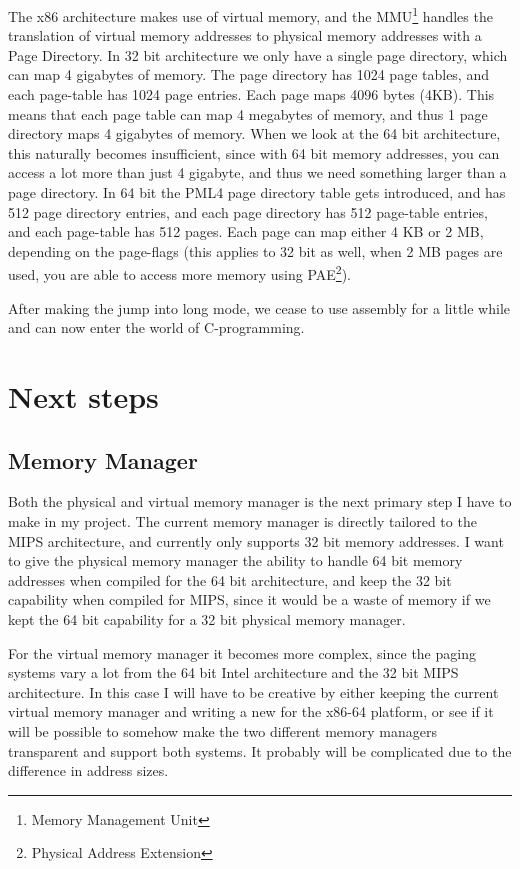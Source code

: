 The x86 architecture makes use of virtual memory, and the MMU\footnote{Memory Management Unit} handles the translation of virtual memory addresses to physical memory addresses with a Page Directory. In 32 bit architecture we only have a single page directory, which can map 4 gigabytes of memory. The page directory has 1024 page tables, and each page-table has 1024 page entries. Each page maps 4096 bytes (4KB). This means that each page table can map 4 megabytes of memory, and thus 1 page directory maps 4 gigabytes of memory. When we look at the 64 bit architecture, this naturally becomes insufficient, since with 64 bit memory addresses, you can access a lot more than just 4 gigabyte, and thus we need something larger than a page directory. In 64 bit the PML4 page directory table gets introduced, and has 512 page directory entries, and each page directory has 512 page-table entries, and each page-table has 512 pages. Each page can map either 4 KB or 2 MB, depending on the page-flags (this applies to 32 bit as well, when 2 MB pages are used, you are able to access more memory using PAE\footnote{Physical Address Extension}).

After making the jump into long mode, we cease to use assembly for a little while and can now enter the world of C-programming.

\newpage
\chapter{Next steps}

\section{Memory Manager}

Both the physical and virtual memory manager is the next primary step I have to make in my project. The current memory manager is directly tailored to the MIPS architecture, and currently only supports 32 bit memory addresses. I want to give the physical memory manager the ability to handle 64 bit memory addresses when compiled for the 64 bit architecture, and keep the 32 bit capability when compiled for MIPS, since it would be a waste of memory if we kept the 64 bit capability for a 32 bit physical memory manager.

For the virtual memory manager it becomes more complex, since the paging systems vary a lot from the 64 bit Intel architecture and the 32 bit MIPS architecture. In this case I will have to be creative by either keeping the current virtual memory manager and writing a new for the x86-64 platform, or see if it will be possible to somehow make the two different memory managers transparent and support both systems. It probably will be complicated due to the difference in address sizes.

